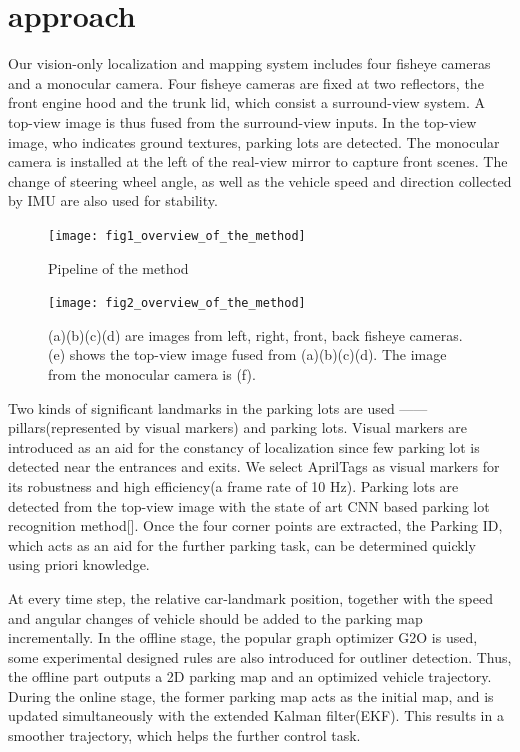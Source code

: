 \documentclass[journal]{IEEEtran}
\begin{document}
\section{approach}

Our vision-only localization and mapping system includes four fisheye cameras and a monocular camera. Four fisheye cameras are fixed at two reflectors, the front engine hood and the trunk lid, which consist a surround-view system. A top-view image is thus fused from the surround-view inputs. In the top-view image, who indicates ground textures, parking lots are detected. The monocular camera is installed at the left of the real-view mirror to capture front scenes. The change of steering wheel angle, as well as the vehicle speed and direction collected by IMU are also used for stability.

\begin{figure}[htbp]
\centering
\texttt{[image: fig1\_overview\_of\_the\_method]}
\caption{Pipeline of the method}\label{fig:1}
\end{figure}

\begin{figure}
\centering
\texttt{[image: fig2\_overview\_of\_the\_method]}
\caption{
(a)(b)(c)(d) are images from left, right, front, back fisheye cameras. (e) shows the top-view image fused from (a)(b)(c)(d). The image from the monocular camera is (f). 
}\label{fig:2}
\end{figure}

Two kinds of significant landmarks in the parking lots are used ——pillars(represented by visual markers) and parking lots. Visual markers are introduced as an aid for the constancy of localization since few parking lot is detected near the entrances and exits. We select AprilTags as visual markers for its robustness and high efficiency(a frame rate of 10 Hz). Parking lots are detected from the top-view image with the state of art CNN based parking lot recognition method[]. Once the four corner points are extracted, the Parking ID, which acts as an aid for the further parking task, can be determined quickly using priori knowledge.
	

At every time step, the relative car-landmark position, together with the speed and angular changes of vehicle should be added to the parking map incrementally. In the offline stage, the popular graph optimizer G2O is used, some experimental designed rules are also introduced for outliner detection. Thus, the offline part outputs a 2D parking map and an optimized vehicle trajectory. During the online stage, the former parking map acts as the initial map, and is updated simultaneously with the extended Kalman filter(EKF). This results in a smoother trajectory, which helps the further control task.
\end{document}

